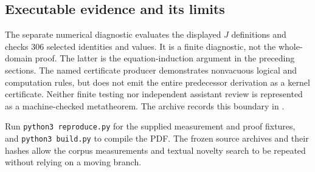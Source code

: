 \subsection{Executable evidence and its limits}

The separate numerical diagnostic evaluates the displayed $J$ definitions
and checks 306 selected identities and values. It is a finite diagnostic,
not the whole-domain proof. The latter is the equation-induction argument
in the preceding sections. The named certificate producer demonstrates
nonvacuous logical and computation rules, but does not emit the entire
predecessor derivation as a kernel certificate. Neither finite testing nor
independent assistant review is represented as a machine-checked
metatheorem. The archive records this boundary in .

Run \texttt{python3 reproduce.py} for the supplied measurement and proof
fixtures, and \texttt{python3 build.py} to compile the PDF. The frozen
source archives and their hashes allow the corpus measurements and
textual novelty search to be repeated without relying on a moving branch.
